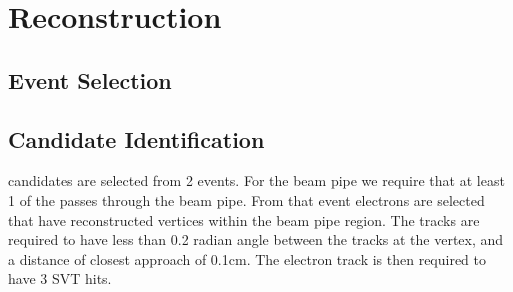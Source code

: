 \section{\deltaray Reconstruction}
\label{sec:reco}
\subsection{\eetomm Event Selection}
\subsection{\deltaray Candidate Identification}
	\deltaray candidates are selected from 2 \mumu events. For the beam pipe we require that at least 1 of the \mmu passes through the beam pipe. From that event electrons are selected that have reconstructed vertices within the beam pipe region. The tracks are required to have less than 0.2 radian angle between the tracks at the vertex, and a distance of closest approach of 0.1cm. The electron track is then required to have 3 SVT hits.